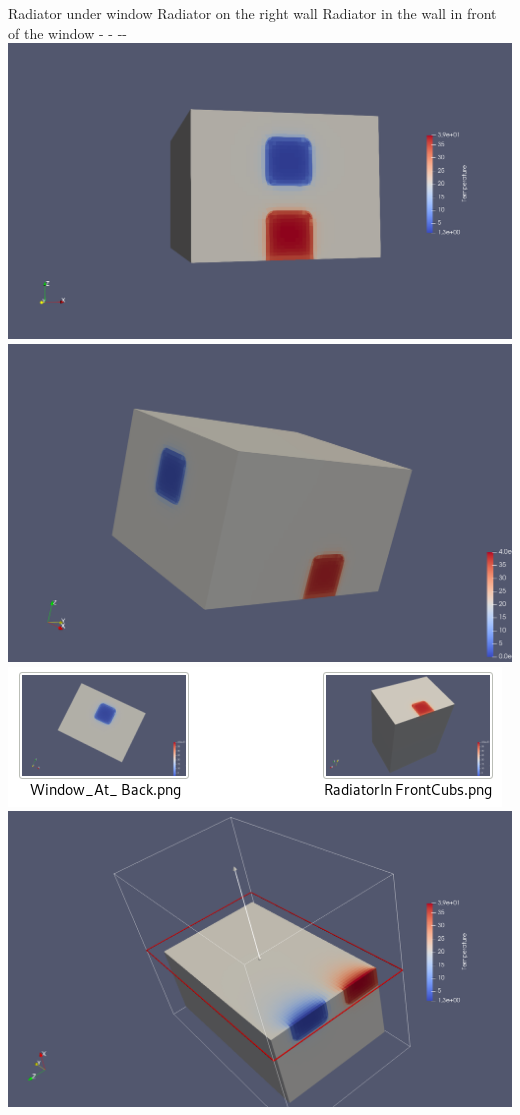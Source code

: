 \documentclass[11pt]{article}
\makeatletter
\def\maxwidth{\ifdim\Gin@nat@width>\linewidth\linewidth
    \else\Gin@nat@width\fi}
\let\Oldincludegraphics\includegraphics
\renewcommand{\includegraphics}[1]{\Oldincludegraphics[width=.8\maxwidth]{#1}}
\makeatother
\begin{document}
Radiator under window\textbar{} Radiator on the right wall \textbar{}
Radiator in the wall in front of the window - \textbar{} - -\textbar{}-
\includegraphics{RoomCouling140745.png} \textbar{}
\includegraphics{ResutlDroitCubs.png} \textbar{}
\includegraphics{CubesDevant.png} \includegraphics{Clipp.png} \textbar{}
\end{document}
